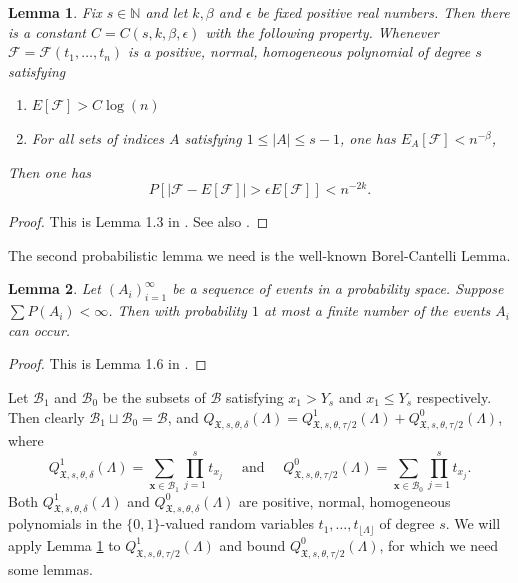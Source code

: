 \documentclass[11pt,reqno]{amsart}
\numberwithin{equation}{section}
\newtheorem{lemma}{Lemma}[section]
\begin{document}
\begin{lemma} \label{lem:polyconc}
Fix $s \in \mathbb{N}$ and let $k, \beta$ and $\epsilon$ be fixed positive real numbers. Then there is a constant $C = C(s,k, \beta, \epsilon)$ with the following property. Whenever $\mathcal{F} = \mathcal{F}(t_1,\ldots, t_n)$ is a positive, normal, homogeneous polynomial of degree $s$ satisfying 
\begin{enumerate}
    \item $E[\mathcal{F}] > C \log(n)$
    \item For all sets of indices $A$ satisfying $1 \leq |A| \leq s-1$, one has $E_A [\mathcal{F}] < n^{-\beta}$,
\end{enumerate}
Then one has 
\[ P[ |\mathcal{F}- E[\mathcal{F}]| > \epsilon E[\mathcal{F}] ] < n^{-2k}. \]
\end{lemma}

\begin{proof} This is Lemma 1.3 in \cite{VuRef}. See also \cite{VuConc}. 
\end{proof}

The second probabilistic lemma we need is the well-known Borel-Cantelli Lemma. 

\begin{lemma} \label{lem:BC}
Let $(A_i)_{i=1}^{\infty}$ be a sequence of events in a probability space. Suppose $\sum P(A_i) < \infty$. Then with probability $1$ at most a finite number of the events $A_i$ can occur. 
\end{lemma}

\begin{proof} This is Lemma 1.6 in \cite{VuRef}. \end{proof}

Let $\mathcal{B}_1$ and $\mathcal{B}_0$ be the subsets of $\mathcal{B}$ satisfying $x_1 > Y_s$ and $x_1 \leq Y_s$ respectively. Then clearly $\mathcal{B}_1 \sqcup \mathcal{B}_0 = \mathcal{B}$, and $Q_{\mathfrak{X},s,\theta, \delta}(\Lambda) = Q^1_{\mathfrak{X},s,\theta,\tau/2}(\Lambda)+ Q^0_{\mathfrak{X},s,\theta,\tau/2}(\Lambda)$, where 
\[ Q^1_{\mathfrak{X},s,\theta,\delta}(\Lambda) = \sum_{\mathbf{x} \in \mathcal{B}_1} \prod_{j=1}^s t_{x_j} \quad \text{ and } \quad Q^0_{\mathfrak{X},s,\theta,\tau/2}(\Lambda) = \sum_{\mathbf{x} \in \mathcal{B}_0} \prod_{j=1}^s t_{x_j}. \]
Both $Q^1_{\mathfrak{X},s,\theta,\delta}(\Lambda)$ and $Q^0_{\mathfrak{X},s,\theta,\delta}(\Lambda)$ are positive, normal, homogeneous polynomials in the $\{0,1\}$-valued random variables $t_1,\ldots,t_{\lfloor \Lambda \rfloor}$ of degree $s$. We will apply Lemma \ref{lem:polyconc} to $Q^1_{\mathfrak{X},s,\theta,\tau/2}(\Lambda)$ and bound $Q^0_{\mathfrak{X},s,\theta,\tau/2}(\Lambda)$, for which we need some lemmas. 
\end{document}
